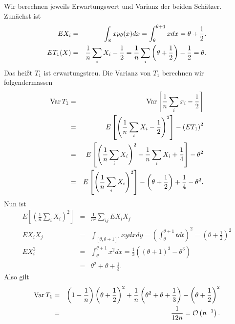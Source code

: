 \solution Wir berechnen jeweils Erwartungswert und Varianz der beiden Schätzer. 
Zunächst ist 
\begin{eqnarray}
	E X_i &=&  \int_{\mathbb R}^{} x p_\theta(x) dx = \int_{\theta}^{\theta+1} x dx = \theta + \frac{1}{2}. \\
	E T_1(X) &=&  \frac{1}{n} \sum_{i}^{} X_i - \frac{1}{2} = \frac{1}{n} \sum_{i}^{} \left( \theta + \frac{1}{2} \right) -\frac{1}{2} = \theta.
\end{eqnarray}
Das heißt $T_1$ ist erwartungstreu. Die Varianz von $T_1$ berechnen wir folgendermassen
\begin{eqnarray}
	\operatorname{Var} T_1 &=& \operatorname{Var} \left[ \frac{1}{n} \sum_{i}^{} x_i - \frac{1}{2} \right] \\
	&=& E\left[ \left(  \frac{1}{n} \sum_{i}^{} X_i - \frac{1}{2} \right)^2  \right] - \left( E T_1 \right)^2 \\
	&=& E \left[  \left( \frac{1}{n} \sum_{i}^{} X_i \right)^2  - \frac{1}{n}\sum_{i}^{} X_i +\frac{1}{4} \right]-\theta^2 \\
	&=& E \left[ \left( \frac{1}{n} \sum_{i}^{} X_i \right)^2 \right] - \left( \theta + \frac{1}{2} \right) + \frac{1}{4}-\theta^2.
\end{eqnarray}
Nun ist 
\begin{eqnarray}
	E \left[ \left( \frac{1}{n} \sum_{i}^{} X_i \right)^2 \right] &=& \frac{1}{n^2} \sum_{ij}^{} E X_i X_j \\
	E X_i X_j &=& \int_{[\theta,\theta+1]^2}^{} xy dx dy = \left( \int_{\theta}^{\theta+1} t dt \right)^2 = \left( \theta+\frac{1}{2} \right)^2 \\
	E X_i^2 &=& \int_{\theta}^{\theta+1} x^2 dx = \frac{1}{3}\left( \left( \theta+1 \right)^3 - \theta^3 \right )\\
	&=& \theta^2 + \theta + \frac{1}{3}.
\end{eqnarray}
Also gilt
\begin{eqnarray}
	\operatorname{Var} T_1 &=& \left( 1-\frac{1}{n} \right)\left( \theta+\frac{1}{2} \right)^2+\frac{1}{n}\left( \theta^2+\theta+\frac{1}{3} \right)     - \left( \theta+\frac{1}{2} \right)^2 \\
	&=& \frac{1}{12 n} = \mathcal O \left( n^{-1} \right).
\end{eqnarray}


